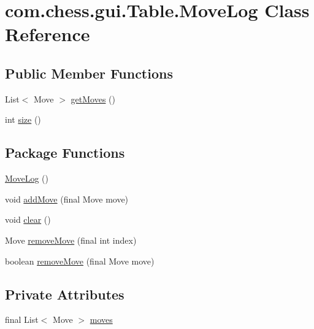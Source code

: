 \hypertarget{classcom_1_1chess_1_1gui_1_1_table_1_1_move_log}{}\section{com.\+chess.\+gui.\+Table.\+Move\+Log Class Reference}
\label{classcom_1_1chess_1_1gui_1_1_table_1_1_move_log}
\subsection*{Public Member Functions}
\begin{DoxyCompactItemize}
\item 
List$<$ Move $>$ \mbox{\hyperlink{classcom_1_1chess_1_1gui_1_1_table_1_1_move_log_a8c811a11f959dcc4d374e88bbc0420e5}{get\+Moves}} ()
\item 
int \mbox{\hyperlink{classcom_1_1chess_1_1gui_1_1_table_1_1_move_log_a36889c8f4c9769b54153e10e8cabc85b}{size}} ()
\end{DoxyCompactItemize}
\subsection*{Package Functions}
\begin{DoxyCompactItemize}
\item 
\mbox{\hyperlink{classcom_1_1chess_1_1gui_1_1_table_1_1_move_log_a4426c0321a0f99344446cff5ca399c20}{Move\+Log}} ()
\item 
void \mbox{\hyperlink{classcom_1_1chess_1_1gui_1_1_table_1_1_move_log_a76fcbf703f15966ee213eb8e2d7d51a1}{add\+Move}} (final Move move)
\item 
void \mbox{\hyperlink{classcom_1_1chess_1_1gui_1_1_table_1_1_move_log_af286e8fb0d814a34f7bbd23b14870a84}{clear}} ()
\item 
Move \mbox{\hyperlink{classcom_1_1chess_1_1gui_1_1_table_1_1_move_log_a612a8d17032018c4dbb3e913d73b5914}{remove\+Move}} (final int index)
\item 
boolean \mbox{\hyperlink{classcom_1_1chess_1_1gui_1_1_table_1_1_move_log_ac952d8633fd1027c8609fcfb5909d40e}{remove\+Move}} (final Move move)
\end{DoxyCompactItemize}
\subsection*{Private Attributes}
\begin{DoxyCompactItemize}
\item 
final List$<$ Move $>$ \mbox{\hyperlink{classcom_1_1chess_1_1gui_1_1_table_1_1_move_log_aed3be7fd7d7c1719dbe66c876eeb7204}{moves}}
\end{DoxyCompactItemize}


